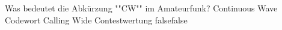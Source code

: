     {Was bedeutet die Abkürzung ""CW"" im Amateurfunk?}
    {Continuous Wave}
    {Codewort}
    {Calling Wide}
    {Contestwertung}
    {false}{false}
